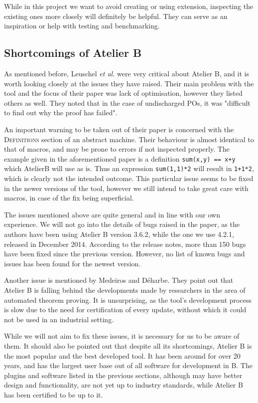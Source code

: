 \documentclass[11pt,journal]{IEEEtran}
\begin{document}
	While in this project we want to avoid creating or using extension, inspecting the existing ones more closely will definitely be helpful. They can serve as an inspiration or help with testing and benchmarking.
	
	\subsection{Shortcomings of Atelier B}
	
	As mentioned before, Leuschel \emph{et al.} were very critical about Atelier B, and it is worth looking closely at the issues they have raised. Their main problem with the tool and the focus of their paper was lack of optimisation, however they listed others as well. They noted that in the case of undischarged POs, it was "difficult to find out why the proof has failed".
	
	An important warning to be taken out of their paper is concerned with the \textsc{Definitions} section of an abstract machine. Their behaviour is almost identical to that of macros, and may be prone to errors if not inspected properly. The example given in the aforementioned paper is a definition \texttt{sum(x,y) == x+y} which AtelierB will use as is. Thus an expression \texttt{sum(1,1)*2} will result in \texttt{1+1*2}, which is clearly not the intended outcome. This particular issue seems to be fixed in the newer versions of the tool, however we still intend to take great care with macros, in case of the fix being superficial.
	
	The issues mentioned above are quite general and in line with our own experience. We will not go into the details of bugs raised in the paper, as the authors have been using Atelier B version 3.6.2, while the one we use 4.2.1, released in December 2014. According to the release notes, more than 150 bugs have been fixed since the previous version. However, no list of known bugs and issues has been found for the newest version\cite{release notes}. 
	
	Another issue is mentioned by Medeiros and D\'{e}harbe\cite{BEval}. They point out that Atelier B is falling behind the developments made by researchers in the area of automated theorem proving. It is unsurprising, as the tool's development process is slow due to the need for certification of every update, without which it could not be used in an industrial setting.
	
	While we will not aim to fix these issues, it is necessary for us to be aware of them. It should also be pointed out that despite all its shortcomings, Atelier B is the most popular and the best developed tool. It has been around for over 20 years, and has the largest user base out of all software for development in B. The plugins and software listed in the previous sections, although may have better design and functionality, are not yet up to industry standards, while Atelier B has been certified to be up to it.
	
\end{document}
